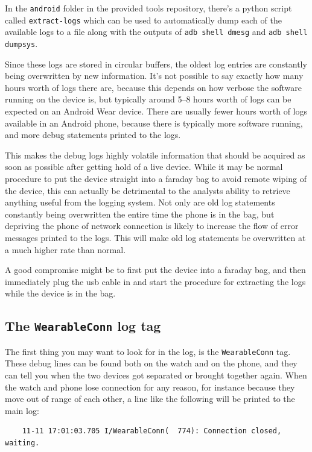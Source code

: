 \documentclass[a4paper,11pt,dvips]{article}
\begin{document}
\noindent
In the \texttt{android} folder in the provided tools repository, there's a python script called \texttt{extract-logs} which can be used to automatically dump each of the available logs to a file along with the outputs of \texttt{adb shell dmesg} and \texttt{adb shell dumpsys}.

Since these logs are stored in circular buffers, the oldest log entries are constantly being overwritten by new information. It's not possible to say exactly how many hours worth of logs there are, because this depends on how verbose the software running on the device is, but typically around 5--8 hours worth of logs can be expected on an Android Wear device. There are usually fewer hours worth of logs available in an Android phone, because there is typically more software running, and more debug statements printed to the logs.

This makes the debug logs highly volatile information that should be acquired as soon as possible after getting hold of a live device. While it may be normal procedure to put the device straight into a faraday bag to avoid remote wiping of the device, this can actually be detrimental to the analysts ability to retrieve anything useful from the logging system. Not only are old log statements constantly being overwritten the entire time the phone is in the bag, but depriving the phone of network connection is likely to increase the flow of error messages printed to the logs. This will make old log statements be overwritten at a much higher rate than normal.

A good compromise might be to first put the device into a faraday bag, and then immediately plug the usb cable in and start the procedure for extracting the logs while the device is in the bag.


\subsection{The \texttt{WearableConn} log tag}

The first thing you may want to look for in the log, is the \texttt{WearableConn} tag. These debug lines can be found both on the watch and on the phone, and they can tell you when the two devices got separated or brought together again. When the watch and phone lose connection for any reason, for instance because they move out of range of each other, a line like the following will be printed to the main log:

\scriptsize
\begin{verbatim}
    11-11 17:01:03.705 I/WearableConn(  774): Connection closed, waiting.
\end{verbatim}
\normalsize
\end{document}
